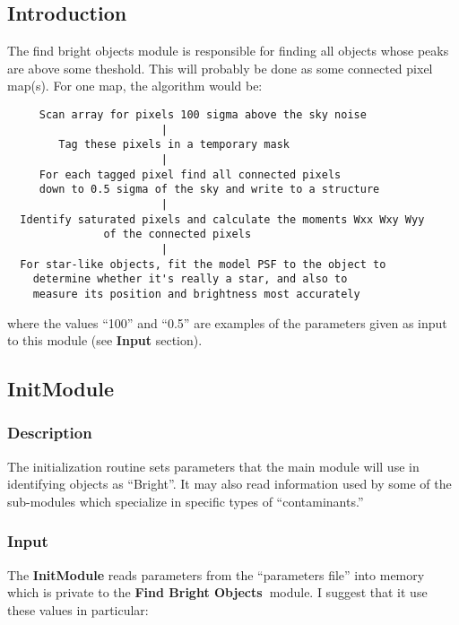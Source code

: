 \def \bom{{\bf Find Bright Objects\ }}

\subsection{Introduction}

The find bright objects module is responsible for finding all objects
whose peaks are above some theshold.  This will probably be done as
some connected pixel map(s).  For one map, the algorithm would be:

\begin{verbatim}
     Scan array for pixels 100 sigma above the sky noise
                        |
        Tag these pixels in a temporary mask
                        |
     For each tagged pixel find all connected pixels
     down to 0.5 sigma of the sky and write to a structure
                        |
  Identify saturated pixels and calculate the moments Wxx Wxy Wyy
               of the connected pixels
                        |
  For star-like objects, fit the model PSF to the object to
    determine whether it's really a star, and also to
    measure its position and brightness most accurately
\end{verbatim}

where the values ``100'' and ``0.5'' are examples of the
parameters given as input to this module (see {\bf Input} section).

\subsection {InitModule}

\subsubsection {Description}

  The initialization routine sets parameters that the main module will
use in identifying objects as ``Bright''.  It may also read information
used by some of the sub-modules which specialize in specific types of
``contaminants.''

\subsubsection {Input}

  The {\bf InitModule} reads parameters from the ``parameters file''
into memory which is private to the \bom module.  I suggest that it
use these values in particular:

